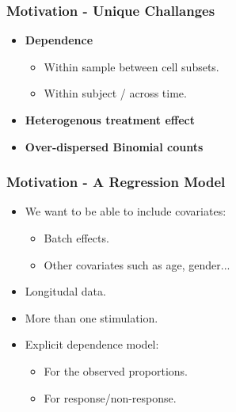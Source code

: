 \documentclass{beamer}
\theoremstyle{definition}
\begin{document}

\begin{frame}
\frametitle{Motivation - Unique Challanges}
\begin{itemize}
\item \textbf{Dependence}
	\begin{itemize}
	\item Within sample between cell subsets.
	\item Within subject / across time.  
	\end{itemize}
\vspace{0.76 cm}
\item \textbf{Heterogenous treatment effect}
\vspace{0.76 cm}
\item \textbf{Over-dispersed Binomial counts}
\end{itemize}
\end{frame}


\begin{frame}
\frametitle{Motivation - A Regression Model}
\begin{itemize}
\item We want to be able to include covariates:
	\begin{itemize}
	\item Batch effects.
	\item Other covariates such as age, gender...
	\end{itemize}

\pause
\vspace{0.7 cm}
\item Longitudal data.

\vspace{0.7 cm}
\item More than one stimulation.

\pause
\vspace{0.7 cm}
\item Explicit dependence model:
	\begin{itemize}
	\item For the observed proportions.
	\item For response/non-response.
	\end{itemize}
\end{itemize}
\end{frame}

\end{document}
